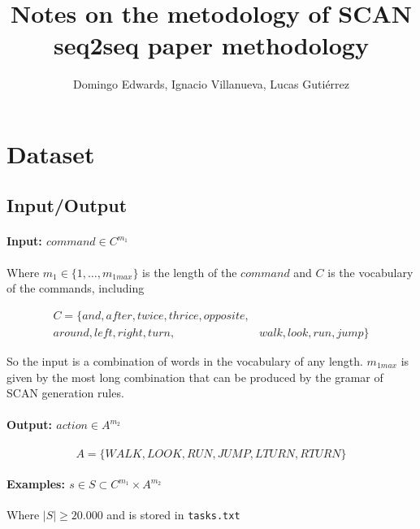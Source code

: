 \documentclass[]{article}
\title{Notes on the metodology of SCAN seq2seq paper methodology}
\author{Domingo Edwards, Ignacio Villanueva, Lucas Gutiérrez}
\begin{document}
\maketitle

\section{Dataset}

\subsection{Input/Output}

\paragraph{Input: $command \in C^{m_1}$}

Where $m_1 \in \{1, \dots, m_{1max}\}$ is the length of the $command$ and $C$ is the vocabulary of the commands, including

\begin{equation}
    \begin{aligned}
        C = \{and, after, twice, thrice, opposite, &                         \\
        around, left, right, turn,                 & walk, look, run, jump\}
    \end{aligned}
\end{equation}

So the input is a combination of words in the vocabulary of any length. $m_{1max}$ is given by the most long combination that can be produced by the gramar of SCAN generation rules.

\paragraph{\textbf{Output}: $action \in A^{m_2}$}

\begin{equation}
    A = \{WALK, LOOK, RUN, JUMP, LTURN, RTURN\}
\end{equation}

\paragraph*{Examples: $s \in S \subset C^{m_1} \times A^{m_2}$\\}

Where $|S| \geq 20.000$ and is stored in \texttt{tasks.txt}
\end{document}
